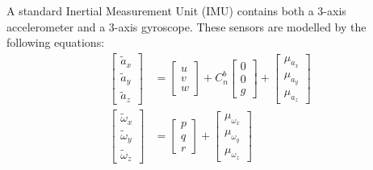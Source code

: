 A standard Inertial Measurement Unit (IMU) contains both a 3-axis accelerometer and a 3-axis gyroscope. These sensors are modelled by the following equations:
\begin{equation}\label{eqn:IMU}
\begin{split}
\begin{bmatrix}
\tilde{a}_{x}\\
\tilde{a}_{y}\\
\tilde{a}_{z}
\end{bmatrix}
&=
\begin{bmatrix}
u\\
v\\
w
\end{bmatrix}
+
C^{b}_{n}
\begin{bmatrix}
0\\
0\\
g
\end{bmatrix}
+
\begin{bmatrix}
\mu_{a_{x}}\\
\mu_{a_{y}}\\
\mu_{a_{z}}
\end{bmatrix}\\
\begin{bmatrix}
\tilde{\omega}_{x}\\
\tilde{\omega}_{y}\\
\tilde{\omega}_{z}
\end{bmatrix}
&=
\begin{bmatrix}
p\\
q\\
r
\end{bmatrix}
+
\begin{bmatrix}
\mu_{\omega_{x}}\\
\mu_{\omega_{y}}\\
\mu_{\omega_{z}}
\end{bmatrix}
\end{split}
\end{equation}

